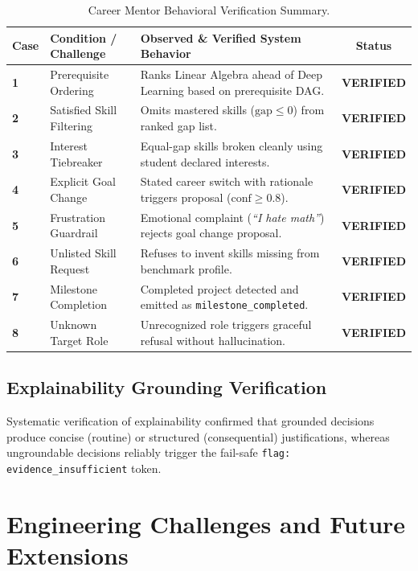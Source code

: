 \documentclass[12pt,a4paper]{article}
\begin{document}
\begin{table}[htbp]
\centering
\small
\renewcommand{\arraystretch}{1.25}
\begin{tabularx}{\textwidth}{l l X c}
\toprule
\textbf{Case} & \textbf{Condition / Challenge} & \textbf{Observed \& Verified System Behavior} & \textbf{Status} \\
\midrule
\textbf{1} & Prerequisite Ordering & Ranks Linear Algebra ahead of Deep Learning based on prerequisite DAG. & \textbf{VERIFIED} \\
\textbf{2} & Satisfied Skill Filtering & Omits mastered skills ($\text{gap} \le 0$) from ranked gap list. & \textbf{VERIFIED} \\
\textbf{3} & Interest Tiebreaker & Equal-gap skills broken cleanly using student declared interests. & \textbf{VERIFIED} \\
\textbf{4} & Explicit Goal Change & Stated career switch with rationale triggers proposal ($\text{conf} \ge 0.8$). & \textbf{VERIFIED} \\
\textbf{5} & Frustration Guardrail & Emotional complaint (\textit{``I hate math''}) rejects goal change proposal. & \textbf{VERIFIED} \\
\textbf{6} & Unlisted Skill Request & Refuses to invent skills missing from benchmark profile. & \textbf{VERIFIED} \\
\textbf{7} & Milestone Completion & Completed project detected and emitted as \texttt{milestone\_completed}. & \textbf{VERIFIED} \\
\textbf{8} & Unknown Target Role & Unrecognized role triggers graceful refusal without hallucination. & \textbf{VERIFIED} \\
\bottomrule
\end{tabularx}
\caption{Career Mentor Behavioral Verification Summary.}
\label{tab:mentor_eval}
\end{table}

\subsection{Explainability Grounding Verification}
Systematic verification of explainability confirmed that grounded decisions produce concise (routine) or structured (consequential) justifications, whereas ungroundable decisions reliably trigger the fail-safe \texttt{flag: evidence\_insufficient} token.

\section{Engineering Challenges and Future Extensions}
\label{sec:challenges}
\end{document}

